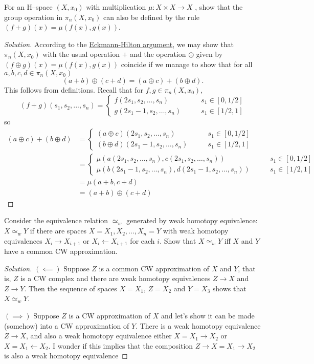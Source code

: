 \documentclass{article}
\numberwithin{equation}{section}
\begin{document}
\begin{exercise}[4.1.3]
	For an H–space $(X , x_0 )$ with multiplication $\mu : X \times X \to X$ , show that the group operation in $\pi_n(X,x_0)$ can also be defined by the rule $(f + g)(x) = \mu(f(x),g(x))$.
\end{exercise}
\begin{proof}[Solution]
	According to the \href{https://en.wikipedia.org/wiki/Eckmann–Hilton_argument}{Eckmann-Hilton argument}, we may show that $\pi_n(X,x_0)$ with the usual operation $+$ and the operation $\oplus$  given by $(f\oplus g)(x) = \mu(f(x),g(x))$ coincide if we manage to show that for all $a,b,c,d\in \pi_n(X,x_0)$
	\[
		(a+b)\oplus(c+d)=(a\oplus c)+(b\oplus d)
	.\]
This follows from definitions. Recall that for $f,g\in \pi_n(X,x_0)$,
\[
	(f+g)(s_1,s_2,...,s_n)=\begin{cases}
		f(2s_1,s_2,\ldots,s_n)\qquad &s_1\in [0,1/2]\\
		g(2s_1-1,s_2,\ldots,s_n)\qquad &s_1\in [1/2,1]
	\end{cases}
\]
so
\begin{align*}
	(a\oplus c)+(b\oplus d)&=\begin{cases}
		(a\oplus c)(2s_1,s_2,\ldots,s_n)\qquad &s_1\in [0,1/2]\\
		(b\oplus d)(2s_1-1,s_2,\ldots,s_n)\qquad &s_1\in [1/2,1]
	\end{cases}\\
		&=\begin{cases}
		\mu(a(2s_1,s_2,\ldots,s_n),c(2s_1,s_2,\ldots,s_n))\qquad &s_1\in [0,1/2]\\
		\mu(b(2s_1-1,s_2,\ldots,s_n),d(2s_1-1,s_2,\ldots,s_n))\qquad &s_1\in [1/2,1]
	\end{cases}\\
		&=\mu(a+b,c+d)\\
		&=(a+ b)\oplus(c+ d)
\end{align*}


\end{proof}

\begin{exercise}[4.1.19]
	Consider the equivalence relation $\simeq_w$ generated by weak homotopy equivalence: $X \simeq_w Y$ if there are spaces $X = X_1, X_2,\ldots, X_n = Y$ with weak homotopy equivalences $X_i\to X_{i+1}$ or $X_i\leftarrow X_{i+1}$ for each $i$. Show that $X\simeq_w Y$ iff $X$ and $Y$ have a common CW approximation.
\end{exercise}
\begin{proof}[Solution]
	$(\impliedby)$ Suppose $Z$ is a common CW approximation of $X$ and $Y$, that is, $Z$ is a CW complex and there are weak homotopy equivalences $Z\to X$ and $Z\to Y$. Then the sequence of spaces $X=X_1$, $Z=X_2$ and $Y=X_3$ shows that $X\simeq_wY$.
	
	$(\implies)$ Suppose $Z$ is a CW approximation of $X$ and let's show it can be made (somehow) into a CW approximation of $Y$. There is a weak homotopy equivalence $Z\to X$, and also a weak homotopy equivalence either $X=X_1\to X_2$ or $X=X_1\leftarrow X_2$. I wonder if this implies that the composition $Z\to X=X_1\to X_2$ is also a weak homotopy equivalence
\end{proof}
\end{document}
